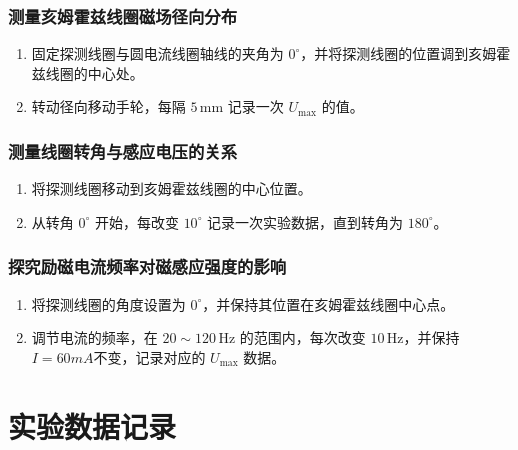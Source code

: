 \documentclass[UTF-8,twoside,cs4size]{ctexart}
\begin{document}
\subsubsection{测量亥姆霍兹线圈磁场径向分布}
\begin{enumerate}
    \item 固定探测线圈与圆电流线圈轴线的夹角为 $0^{\circ}$，并将探测线圈的位置调到亥姆霍兹线圈的中心处。\par
    \item 转动径向移动手轮，每隔 $5 \, \mathrm{mm}$ 记录一次 $U_{\max}$ 的值。\par
\end{enumerate}

\subsubsection{测量线圈转角与感应电压的关系}
\begin{enumerate}
    \item 将探测线圈移动到亥姆霍兹线圈的中心位置。\par
    \item 从转角 $0^{\circ}$ 开始，每改变 $10^{\circ}$ 记录一次实验数据，直到转角为 $180^{\circ}$。\par
\end{enumerate}

\subsubsection{探究励磁电流频率对磁感应强度的影响}
\begin{enumerate}
    \item 将探测线圈的角度设置为 $0^{\circ}$，并保持其位置在亥姆霍兹线圈中心点。\par
    \item 调节电流的频率，在 $20 \sim 120 \, \mathrm{Hz}$ 的范围内，每次改变 $10 \, \mathrm{Hz}$，并保持$I=60mA$不变，记录对应的 $U_{\max}$ 数据。\par
\end{enumerate}

\section{实验数据记录}
\end{document}
